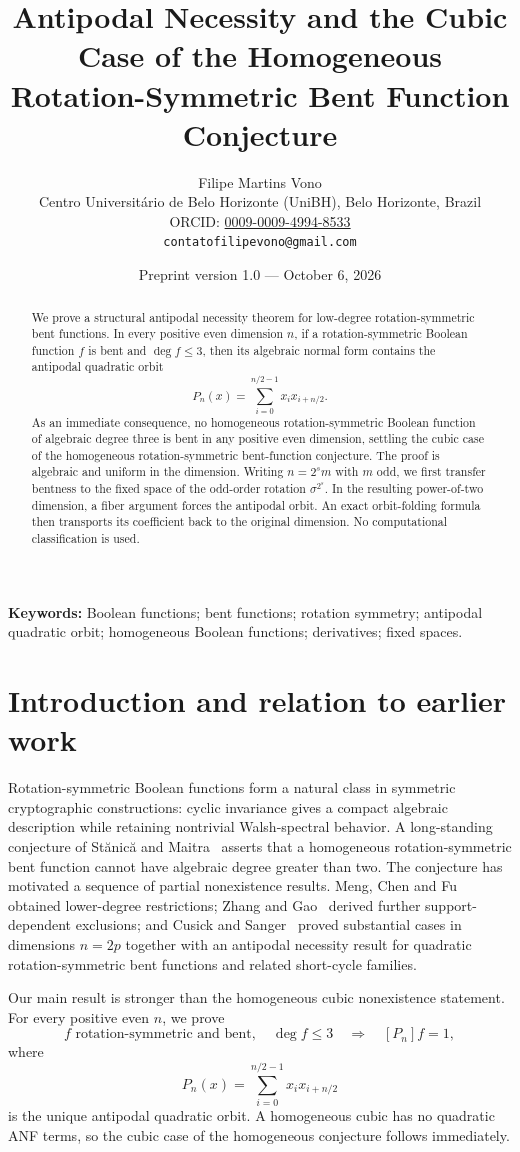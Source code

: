\documentclass[11pt,a4paper]{article}
\title{Antipodal Necessity and the Cubic Case of the Homogeneous Rotation-Symmetric Bent Function Conjecture}
\author{Filipe Martins Vono\\
\small Centro Universit\'ario de Belo Horizonte (UniBH), Belo Horizonte, Brazil\\
\small ORCID: \href{https://orcid.org/0009-0009-4994-8533}{0009-0009-4994-8533}\\
\small \texttt{contatofilipevono@gmail.com}}
\date{Preprint version 1.0 --- October 6, 2026}
\begin{document}
\maketitle
\begin{abstract}
We prove a structural antipodal necessity theorem for low-degree rotation-symmetric bent functions. In every positive even dimension $n$, if a rotation-symmetric Boolean function $f$ is bent and $\deg f\le3$, then its algebraic normal form contains the antipodal quadratic orbit
\[
P_n(x)=\sum_{i=0}^{n/2-1}x_i x_{i+n/2}.
\]
As an immediate consequence, no homogeneous rotation-symmetric Boolean function of algebraic degree three is bent in any positive even dimension, settling the cubic case of the homogeneous rotation-symmetric bent-function conjecture. The proof is algebraic and uniform in the dimension. Writing $n=2^s m$ with $m$ odd, we first transfer bentness to the fixed space of the odd-order rotation $\sigma^{2^s}$. In the resulting power-of-two dimension, a fiber argument forces the antipodal orbit. An exact orbit-folding formula then transports its coefficient back to the original dimension. No computational classification is used.
\end{abstract}
\noindent\textbf{Keywords:} Boolean functions; bent functions; rotation symmetry; antipodal quadratic orbit; homogeneous Boolean functions; derivatives; fixed spaces.

\section{Introduction and relation to earlier work}
Rotation-symmetric Boolean functions form a natural class in symmetric cryptographic constructions: cyclic invariance gives a compact algebraic description while retaining nontrivial Walsh-spectral behavior. A long-standing conjecture of St\u{a}nic\u{a} and Maitra~\cite{stanica} asserts that a homogeneous rotation-symmetric bent function cannot have algebraic degree greater than two. The conjecture has motivated a sequence of partial nonexistence results. Meng, Chen and Fu~\cite{meng} obtained lower-degree restrictions; Zhang and Gao~\cite{zhang} derived further support-dependent exclusions; and Cusick and Sanger~\cite{cusick} proved substantial cases in dimensions $n=2p$ together with an antipodal necessity result for quadratic rotation-symmetric bent functions and related short-cycle families.

Our main result is stronger than the homogeneous cubic nonexistence statement. For every positive even $n$, we prove
\[
\boxed{
f\text{ rotation-symmetric and bent},\quad \deg f\le3
\quad\Longrightarrow\quad
[P_n]f=1,
}
\]
where
\[
P_n(x)=\sum_{i=0}^{n/2-1}x_i x_{i+n/2}
\]
is the unique antipodal quadratic orbit. A homogeneous cubic has no quadratic ANF terms, so the cubic case of the homogeneous conjecture follows immediately.
\end{document}
